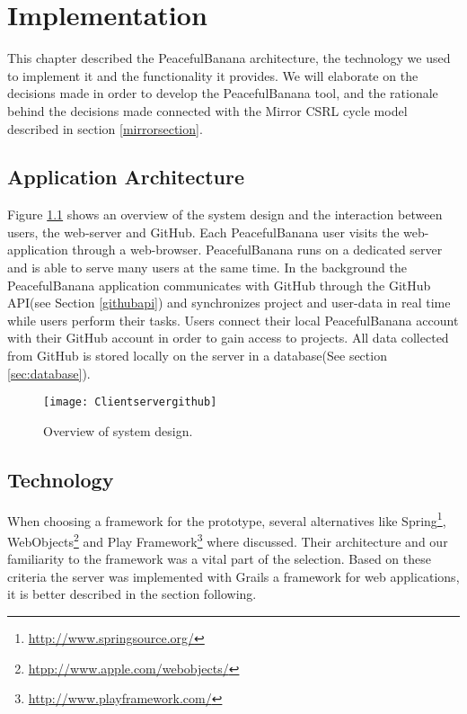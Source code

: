 \chapter{Implementation}
\label{chap:implementation}
This chapter described the PeacefulBanana architecture, the technology we used to implement it and the functionality it provides. 
We will elaborate on the decisions made in order to develop the PeacefulBanana tool, and the rationale behind the decisions made connected with the Mirror CSRL cycle model described in section \ref{mirrorsection}. 

\section{Application Architecture}
Figure \ref{ClientServerGithub} shows an overview of the system design and the interaction between users, the web-server and GitHub. Each PeacefulBanana user visits the web-application through a web-browser. PeacefulBanana runs on a dedicated server and is able to serve many users at the same time. In the background the PeacefulBanana application communicates with GitHub through the GitHub API(see Section \ref{githubapi}) and synchronizes project and user-data in real time while users perform their tasks. Users connect their local PeacefulBanana account with their GitHub account in order to gain access to projects. All data collected from GitHub is stored locally on the server in a database(See section \ref{sec:database}). 
\begin{figure}[H]
    \centering
        \texttt{[image: Clientservergithub]}
    \caption{Overview of system design.}
    \label{ClientServerGithub}
\end{figure}

\section{Technology}
When choosing a framework for the prototype, several alternatives like Spring\footnote{\url{http://www.springsource.org/}}, WebObjects\footnote{\url{htpp://www.apple.com/webobjects/}} and Play Framework\footnote{\url{http://www.playframework.com/}} where discussed. Their architecture and our familiarity to the framework was a vital part of the selection. Based on these criteria the server was implemented with Grails a framework for web applications, it is better described in the section following.

